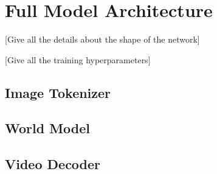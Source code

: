 \clearpage
\appendix

\section{Full Model Architecture}
[Give all the details about the shape of the network]

[Give all the training hyperparameters]

\subsection{Image Tokenizer}
\label{appendix:image-tokenizer}

\subsection{World Model}
\label{appendix:world-model}

\subsection{Video Decoder}
\label{appendix:video-decoder}
